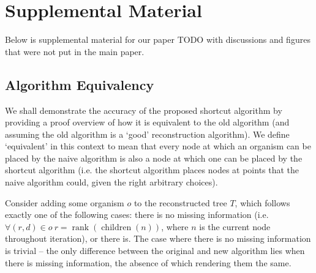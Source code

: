 \appendix
\section*{\Huge Supplemental Material}

\setcounter{section}{0}

\makeatletter
\def\@seccntformat#1{\@ifundefined{#1@cntformat}%
   {\csname the#1\endcsname\space}%
   {\csname #1@cntformat\endcsname}}%
\newcommand\section@cntformat{\thesection.\space} %
\makeatother
\renewcommand{\thesection}{S\arabic{section}}

\vspace{0.8em}

Below is supplemental material for our paper TODO with discussions and figures that were not put in the main paper.

\subsection{Algorithm Equivalency}

\label{sec:algorithm:equivalency}

We shall demonstrate the accuracy of the proposed shortcut algorithm by providing a proof overview of how it is equivalent to the old algorithm (and assuming the old algorithm is a `good' reconstruction algorithm).
We define `equivalent' in this context to mean that every node at which an organism can be placed by the naive algorithm is also a node at which one can be placed by the shortcut algorithm (i.e. the shortcut algorithm places nodes at points that the naive algorithm could, given the right arbitrary choices).

Consider adding some organism $o$ to the reconstructed tree $T$, which follows exactly one of the following cases: there is no missing information (i.e. $\forall (r, d) \in o\ r = \operatorname{rank}(\operatorname{children}(n))$, where $n$ is the current node throughout iteration), or there is.
The case where there is no missing information is trivial -- the only difference between the original and new algorithm lies when there is missing information, the absence of which rendering them the same.

